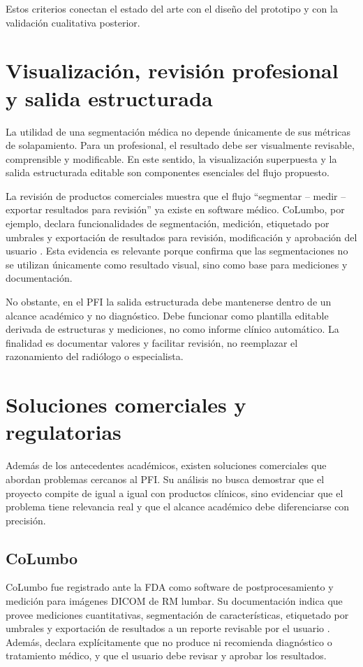 Estos criterios conectan el estado del arte con el diseño del prototipo y con la validación cualitativa posterior.

\section{Visualización, revisión profesional y salida estructurada}

La utilidad de una segmentación médica no depende únicamente de sus métricas de solapamiento. Para un profesional, el resultado debe ser visualmente revisable, comprensible y modificable. En este sentido, la visualización superpuesta y la salida estructurada editable son componentes esenciales del flujo propuesto.

La revisión de productos comerciales muestra que el flujo \enquote{segmentar -- medir -- exportar resultados para revisión} ya existe en software médico. CoLumbo, por ejemplo, declara funcionalidades de segmentación, medición, etiquetado por umbrales y exportación de resultados para revisión, modificación y aprobación del usuario \parencite{fda_columbo_2022}. Esta evidencia es relevante porque confirma que las segmentaciones no se utilizan únicamente como resultado visual, sino como base para mediciones y documentación.

No obstante, en el PFI la salida estructurada debe mantenerse dentro de un alcance académico y no diagnóstico. Debe funcionar como plantilla editable derivada de estructuras y mediciones, no como informe clínico automático. La finalidad es documentar valores y facilitar revisión, no reemplazar el razonamiento del radiólogo o especialista.

\section{Soluciones comerciales y regulatorias}

Además de los antecedentes académicos, existen soluciones comerciales que abordan problemas cercanos al PFI. Su análisis no busca demostrar que el proyecto compite de igual a igual con productos clínicos, sino evidenciar que el problema tiene relevancia real y que el alcance académico debe diferenciarse con precisión.

\subsection{CoLumbo}

CoLumbo fue registrado ante la FDA como software de postprocesamiento y medición para imágenes DICOM de RM lumbar. Su documentación indica que provee mediciones cuantitativas, segmentación de características, etiquetado por umbrales y exportación de resultados a un reporte revisable por el usuario \parencite{fda_columbo_2022}. Además, declara explícitamente que no produce ni recomienda diagnóstico o tratamiento médico, y que el usuario debe revisar y aprobar los resultados.

